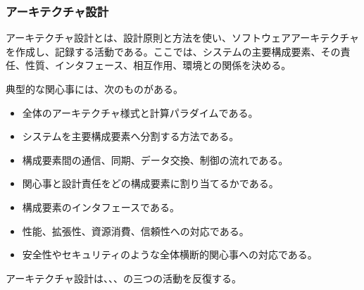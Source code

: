 \subsubsection{アーキテクチャ設計}
アーキテクチャ設計とは、設計原則と方法を使い、ソフトウェアアーキテクチャを作成し、記録する活動である。ここでは、システムの主要構成要素、その責任、性質、インタフェース、相互作用、環境との関係を決める。

典型的な関心事には、次のものがある。
\begin{itemize}
  \item 全体のアーキテクチャ様式と計算パラダイムである。
  \item システムを主要構成要素へ分割する方法である。
  \item 構成要素間の通信、同期、データ交換、制御の流れである。
  \item 関心事と設計責任をどの構成要素に割り当てるかである。
  \item 構成要素のインタフェースである。
  \item 性能、拡張性、資源消費、信頼性への対応である。
  \item 安全性やセキュリティのような全体横断的関心事への対応である。
\end{itemize}

アーキテクチャ設計は、、、の三つの活動を反復する。
